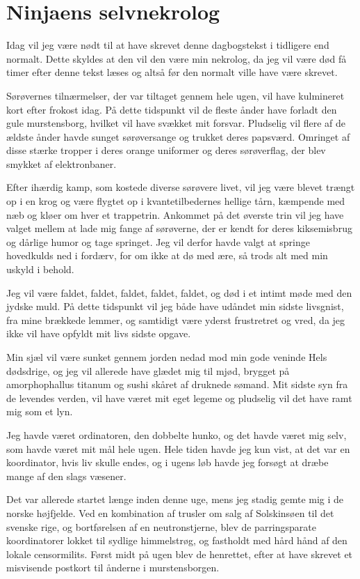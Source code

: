 \begin{minipage}[t]{150mm}
\vspace{3mm}
\section*{Ninjaens selvnekrolog}
Idag vil jeg være nødt til at have skrevet denne dagbogstekst i tidligere end normalt. Dette skyldes at den vil den være min nekrolog, da jeg vil være død få timer efter denne tekst læses og altså før den normalt ville  have være skrevet.

Sørøvernes tilnærmelser, der var tiltaget gennem hele ugen, vil have kulmineret kort efter frokost idag. På dette tidspunkt vil de fleste ånder have forladt den gule murstensborg, hvilket vil have svækket mit forsvar. Pludselig vil flere af de ældste ånder havde sunget sørøversange og trukket deres papsværd. Omringet af disse stærke tropper i deres orange uniformer og deres sørøverflag, der blev smykket af elektronbaner. 

Efter ihærdig kamp, som kostede diverse sørøvere livet, vil jeg være blevet trængt op i en krog og være flygtet op i kvantetilbedernes hellige tårn, kæmpende med næb og kløer om hver et trappetrin. Ankommet på det øverste trin vil jeg have valget mellem at lade mig fange af sørøverne, der er kendt for deres kiksemisbrug og dårlige humor og tage springet. Jeg vil derfor havde valgt at springe hovedkulds ned i fordærv, for om ikke at dø med ære, så trods alt med min uskyld i behold.

Jeg vil være faldet, faldet, faldet, faldet, faldet, og død i et intimt møde med den jydske 
muld. På dette tidspunkt vil jeg både have udåndet min sidste livsgnist, fra mine brækkede lemmer, og samtidigt være yderst frustretret og vred, da jeg ikke vil have opfyldt mit livs sidste opgave. 

Min sjæl vil være sunket gennem jorden nedad mod min gode veninde Hels dødsdrige, og jeg vil allerede have  glædet mig til mjød, brygget på amorphophallus titanum og sushi skåret af druknede sømand. Mit sidste syn fra de levendes verden, vil have været mit eget legeme og pludselig vil det have ramt mig som et lyn.

Jeg havde været ordinatoren, den dobbelte hunko, og det havde været mig selv, som havde været mit mål hele ugen. Hele tiden havde jeg kun vist, at det var en koordinator, hvis liv skulle endes, og i ugens løb havde jeg forsøgt at dræbe mange af den slags væsener.

Det var allerede startet længe inden denne uge, mens jeg stadig gemte mig i de norske højfjelde. Ved en kombination af trusler om salg af Solskinsøen til det svenske rige, og bortførelsen af en neutronstjerne, blev de parringsparate koordinatorer lokket til sydlige himmelstrøg, og fastholdt med hård hånd af den lokale censormilits. Først midt på ugen blev de henrettet, efter at have skrevet et misvisende postkort til ånderne i murstensborgen.


\end{minipage}
